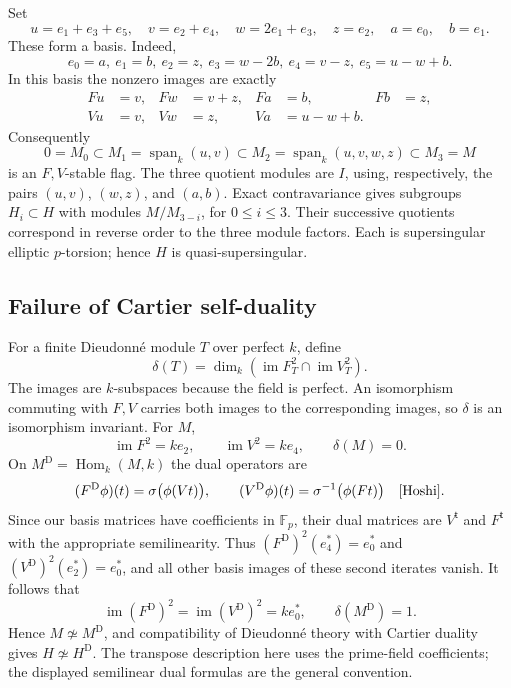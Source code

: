 \documentclass[10pt]{article}
\newcommand{\im}{\operatorname{im}}
\newcommand{\Span}{\operatorname{span}}
\newcommand{\dual}{\mathrm D}
\begin{document}
Set
\[
 u=e_1+e_3+e_5,\quad v=e_2+e_4,\quad
 w=2e_1+e_3,\quad z=e_2,\quad a=e_0,\quad b=e_1.
\]
These form a basis. Indeed,
\[
 e_0=a,\ e_1=b,\ e_2=z,\ e_3=w-2b,\
 e_4=v-z,\ e_5=u-w+b.
\]
In this basis the nonzero images are exactly
\begin{align*}
 Fu&=v,& Fw&=v+z,& Fa&=b,& Fb&=z,\\
 Vu&=v,& Vw&=z,& Va&=u-w+b.
\end{align*}
Consequently
\[
 0=M_0\subset M_1=\Span_k(u,v)
 \subset M_2=\Span_k(u,v,w,z)\subset M_3=M
\]
is an $F,V$-stable flag. The three quotient modules are $I$, using,
respectively, the pairs $(u,v)$, $(w,z)$, and $(a,b)$.
Exact contravariance gives subgroups $H_i\subset H$ with modules
$M/M_{3-i}$, for $0\leq i\leq3$.
Their successive quotients correspond in reverse order to the three
module factors. Each is supersingular elliptic $p$-torsion; hence
$H$ is quasi-supersingular.

\subsection{Failure of Cartier self-duality}
For a finite Dieudonn\'e module $T$ over perfect $k$, define
\[
 \delta(T)=\dim_k(\im F_T^2\cap\im V_T^2).
\]
The images are $k$-subspaces because the field is perfect.
An isomorphism commuting with $F,V$ carries both images to the
corresponding images, so $\delta$ is an isomorphism invariant.
For $M$,
\[
 \im F^2=k e_2,\qquad \im V^2=k e_4,\qquad \delta(M)=0.
\]
On $M^{\dual}=\operatorname{Hom}_k(M,k)$ the dual operators are
\[
 (F^{\dual}\phi)(t)=\sigma\bigl(\phi(Vt)\bigr),\qquad
 (V^{\dual}\phi)(t)=\sigma^{-1}\bigl(\phi(Ft)\bigr)
 \quad\text{\cite[Definition~2.3]{Hoshi}}.
\]
Since our basis matrices have coefficients in $\mathbb F_p$, their
dual matrices are $V^{\mathsf t}$ and $F^{\mathsf t}$ with the
appropriate semilinearity. Thus $(F^{\dual})^2(e_4^*)=e_0^*$ and
$(V^{\dual})^2(e_2^*)=e_0^*$, and all other basis images of these
second iterates vanish. It follows that
\[
 \im(F^{\dual})^2=\im(V^{\dual})^2=k e_0^*,\qquad
 \delta(M^{\dual})=1.
\]
Hence $M\not\simeq M^{\dual}$, and compatibility of Dieudonn\'e
theory with Cartier duality gives $H\not\simeq H^{\dual}$.
The transpose description here uses the prime-field coefficients;
the displayed semilinear dual formulas are the general convention.
\end{document}
